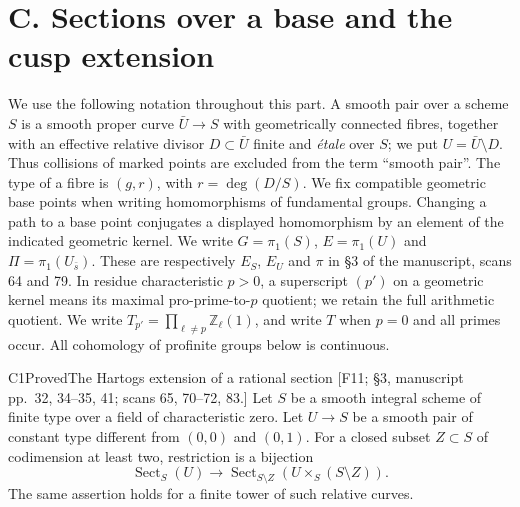 \section{C. Sections over a base and the cusp extension}
\label{part:C}

We use the following notation throughout this part. A smooth pair over a scheme
$S$ is a smooth proper curve $\bar U\to S$ with geometrically connected fibres,
together with an effective relative divisor $D\subset\bar U$ finite and
\emph{\'etale} over $S$; we put $U=\bar U\setminus D$. Thus collisions of
marked points are excluded from the term ``smooth pair''. The type of a fibre
is $(g,r)$, with $r=\deg(D/S)$. We fix compatible geometric base points when
writing homomorphisms of fundamental groups. Changing a path to a base point
conjugates a displayed homomorphism by an element of the indicated geometric
kernel. We write $G=\pi_1(S)$, $E=\pi_1(U)$ and
$\Pi=\pi_1(U_{\bar s})$. These are respectively $E_S$, $E_U$ and $\pi$ in
\S3 of the manuscript, scans 64 and 79. In residue characteristic $p>0$, a
superscript $(p')$ on a geometric kernel means its maximal pro-prime-to-$p$
quotient; we retain the full arithmetic quotient. We write
$T_{p'}=\prod_{\ell\ne p}\mathbb Z_\ell(1)$, and write $T$ when $p=0$ and
all primes occur. All cohomology of profinite groups below is continuous.

\begin{result}{C1}{Proved}{The Hartogs extension of a rational section}
\textup{[F11; \S3, manuscript pp.\ 32, 34--35, 41; scans 65, 70--72, 83.]}
Let $S$ be a smooth integral scheme of finite type over a field of
characteristic zero. Let $U\to S$ be a smooth pair of constant type different
from $(0,0)$ and $(0,1)$. For a closed subset $Z\subset S$ of codimension at
least two, restriction is a bijection
\[
 \operatorname{Sect}_S(U)\longrightarrow
 \operatorname{Sect}_{S\setminus Z}(U\times_S(S\setminus Z)).
\]
The same assertion holds for a finite tower of such relative curves.
\end{result}

